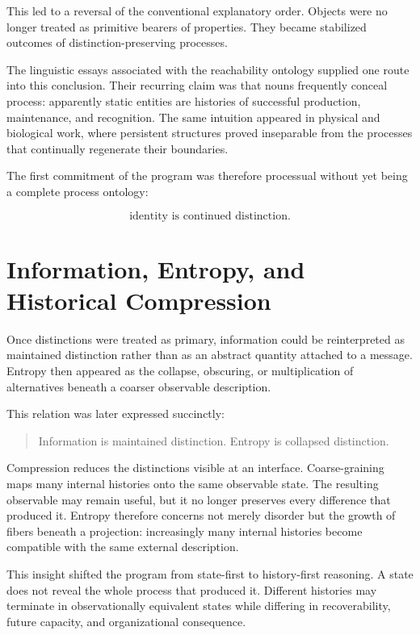 \documentclass[11pt,oneside]{book}
\numberwithin{equation}{chapter}
\theoremstyle{definition}
\theoremstyle{plain}
\begin{document}
This led to a reversal of the conventional explanatory order. Objects were
no longer treated as primitive bearers of properties. They became
stabilized outcomes of distinction-preserving processes.

The linguistic essays associated with the reachability ontology supplied one
route into this conclusion. Their recurring claim was that nouns frequently
conceal process: apparently static entities are histories of successful
production, maintenance, and recognition. The same intuition appeared in
physical and biological work, where persistent structures proved
inseparable from the processes that continually regenerate their
boundaries.

The first commitment of the program was therefore processual without yet
being a complete process ontology:

\[
\text{identity is continued distinction}.
\]

\section{Information, Entropy, and Historical Compression}

Once distinctions were treated as primary, information could be
reinterpreted as maintained distinction rather than as an abstract quantity
attached to a message. Entropy then appeared as the collapse, obscuring, or
multiplication of alternatives beneath a coarser observable description.

This relation was later expressed succinctly:

\begin{quote}
Information is maintained distinction. Entropy is collapsed distinction.
\end{quote}

Compression reduces the distinctions visible at an interface. Coarse-graining
maps many internal histories onto the same observable state. The resulting
observable may remain useful, but it no longer preserves every difference
that produced it. Entropy therefore concerns not merely disorder but the
growth of fibers beneath a projection: increasingly many internal histories
become compatible with the same external description.

This insight shifted the program from state-first to history-first
reasoning. A state does not reveal the whole process that produced it.
Different histories may terminate in observationally equivalent states
while differing in recoverability, future capacity, and organizational
consequence.
\end{document}
